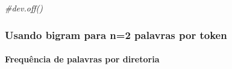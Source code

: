 \documentclass[]{article}
\newenvironment{Shaded}{\begin{snugshade}}{\end{snugshade}}
\newcommand{\CommentTok}[1]{\textcolor[rgb]{0.56,0.35,0.01}{\textit{#1}}}
\let\oldparagraph\paragraph
\renewcommand{\paragraph}[1]{\oldparagraph{#1}\mbox{}}
\begin{document}
\begin{Shaded}
\begin{Highlighting}[]
\CommentTok{#dev.off()}
\end{Highlighting}
\end{Shaded}

\subsubsection{Usando bigram para n=2 palavras por
token}\label{usando-bigram-para-n2-palavras-por-token}

\paragraph{Frequência de palavras por
diretoria}\label{frequencia-de-palavras-por-diretoria-1}
\end{document}

